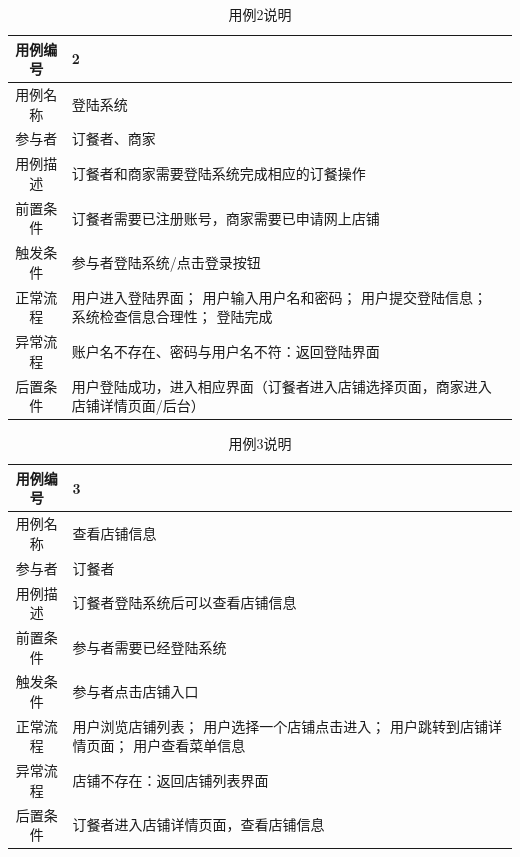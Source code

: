 \documentclass{article}
\begin{document}
    \begin{table}[H]
        \centering
        \caption{用例2说明}
        \begin{tabular}{cm{12cm}}
            \hline
            用例编号 & 2 \\
            \hline
            用例名称 & 登陆系统 \\
            \hline
            参与者 & 订餐者、商家 \\
            \hline
            用例描述 & 订餐者和商家需要登陆系统完成相应的订餐操作 \\
            \hline
            前置条件 & 订餐者需要已注册账号，商家需要已申请网上店铺 \\
            \hline
            触发条件 & 参与者登陆系统/点击登录按钮 \\
            \hline
            正常流程 & 用户进入登陆界面； 用户输入用户名和密码； 用户提交登陆信息； 系统检查信息合理性； 登陆完成 \\
            \hline
            异常流程 & 账户名不存在、密码与用户名不符：返回登陆界面 \\
            \hline
            后置条件 & 用户登陆成功，进入相应界面（订餐者进入店铺选择页面，商家进入店铺详情页面/后台） \\
            \hline
        \end{tabular}
    \end{table}
    \begin{table}[H]
        \centering
        \caption{用例3说明}
        \begin{tabular}{cm{12cm}}
            \hline
            用例编号 & 3 \\
            \hline
            用例名称 & 查看店铺信息 \\
            \hline
            参与者 & 订餐者 \\
            \hline
            用例描述 & 订餐者登陆系统后可以查看店铺信息 \\
            \hline
            前置条件 & 参与者需要已经登陆系统 \\
            \hline
            触发条件 & 参与者点击店铺入口 \\
            \hline
            正常流程 & 用户浏览店铺列表； 用户选择一个店铺点击进入； 用户跳转到店铺详情页面； 用户查看菜单信息 \\
            \hline
            异常流程 & 店铺不存在：返回店铺列表界面 \\
            \hline
            后置条件 & 订餐者进入店铺详情页面，查看店铺信息 \\
            \hline
        \end{tabular}
    \end{table}
\end{document}

